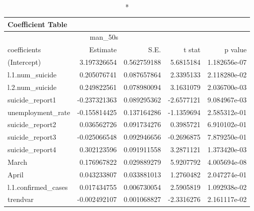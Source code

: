 \begin{longtable}{lrrrr}
\caption*{
{\large Coefficient Table}
} \\ 
\toprule
\multicolumn{4}{c}{man\_50s} &  \\ 
\cmidrule(lr){1-4}
coefficients & Estimate & S.E. & t stat & p value \\ 
\midrule\addlinespace[2.5pt]
(Intercept) & 3.197326654 & 0.562759188 & 5.6815184 & 1.182656e-07 \\ 
l.1.num\_suicide & 0.205076741 & 0.087657864 & 2.3395133 & 2.118280e-02 \\ 
l.2.num\_suicide & 0.249822561 & 0.078980094 & 3.1631079 & 2.036700e-03 \\ 
suicide\_report1 & -0.237321363 & 0.089295362 & -2.6577121 & 9.084967e-03 \\ 
unemployment\_rate & -0.155814425 & 0.137164286 & -1.1359694 & 2.585312e-01 \\ 
suicide\_report2 & 0.036562726 & 0.091734276 & 0.3985721 & 6.910102e-01 \\ 
suicide\_report3 & -0.025066548 & 0.092946656 & -0.2696875 & 7.879250e-01 \\ 
suicide\_report4 & 0.302123596 & 0.091911558 & 3.2871121 & 1.373420e-03 \\ 
March & 0.176967822 & 0.029889279 & 5.9207792 & 4.005694e-08 \\ 
April & 0.043233807 & 0.033881013 & 1.2760482 & 2.047274e-01 \\ 
l.1.confirmed\_cases & 0.017434755 & 0.006730054 & 2.5905819 & 1.092938e-02 \\ 
trendvar & -0.002492107 & 0.001068827 & -2.3316276 & 2.161117e-02 \\ 
\bottomrule
\end{longtable}

